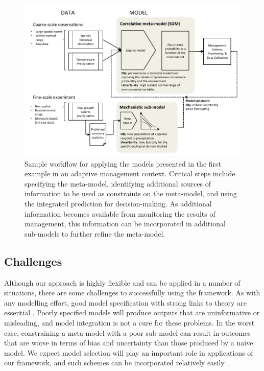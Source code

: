 \begin{figure}[tb]
	\includegraphics{adaptive_management.pdf}
	\caption{Sample workflow for applying the models presented in the first example in an adaptive management context.
	Critical steps include specifying the meta-model, identifying additional sources of information to be used as constraints on the meta-model, and using the integrated prediction for decision-making.
	As additional information becomes available from monitoring the results of management, this information can be incorporated in additional sub-models to further refine the meta-model.}
	\label{fig:adaptive_management}
\end{figure}



\subsection*{Challenges} 
Although our approach is highly flexible and can be applied in a number of situations, there are some challenges to successfully using the framework.
As with any modelling effort, good model specification with strong links to theory are essential \citep{Austin2007}.
Poorly specified models will produce outputs that are uninformative or misleading, and model integration is not a cure for these problems.
In the worst case, constraining a meta-model with a poor sub-model can result in outcomes that are worse in terms of bias and uncertainty than those produced by a naive model.
We expect model selection will play an important role in applications of our framework, and such schemes can be incorporated relatively easily \citep{Madigan1995, Wasserman2000, Tenan2014}.

